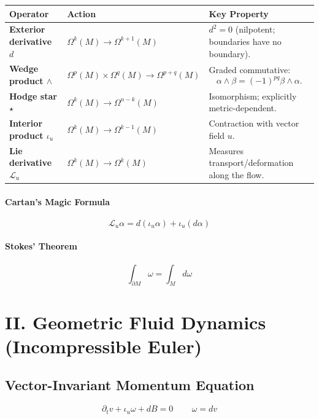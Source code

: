 \documentclass[11pt]{article}
\begin{document}
\begin{longtable}{>{\bfseries}p{}p{}p{}}
Operator & Action & Key Property\\
\midrule

Exterior derivative $d$
&
$\Omega^k(M)\rightarrow\Omega^{k+1}(M)$
&
$d^2=0$ (nilpotent; boundaries have no boundary).\\

Wedge product $\wedge$
&
$\Omega^p(M)\times\Omega^q(M)\rightarrow\Omega^{p+q}(M)$
&
Graded commutative:
\[
\alpha\wedge\beta=(-1)^{pq}\beta\wedge\alpha.
\]
\\

Hodge star $\star$
&
$\Omega^k(M)\rightarrow\Omega^{n-k}(M)$
&
Isomorphism; explicitly metric-dependent.\\

Interior product $\iota_u$
&
$\Omega^k(M)\rightarrow\Omega^{k-1}(M)$
&
Contraction with vector field $u$.\\

Lie derivative $\mathcal{L}_u$
&
$\Omega^k(M)\rightarrow\Omega^k(M)$
&
Measures transport/deformation along the flow.
\end{longtable}

\paragraph{Cartan's Magic Formula}

\[
\boxed{
\mathcal{L}_u\alpha
=
d(\iota_u\alpha)
+
\iota_u(d\alpha)
}
\]

\paragraph{Stokes' Theorem}

\[
\boxed{
\int_{\partial M}\omega
=
\int_M d\omega
}
\]

\section*{II. Geometric Fluid Dynamics (Incompressible Euler)}

\subsection*{Vector-Invariant Momentum Equation}

\[
\boxed{
\partial_t v
+
\iota_u\omega
+
dB
=
0\,
\qquad
\omega=dv
}
\]
\end{document}
